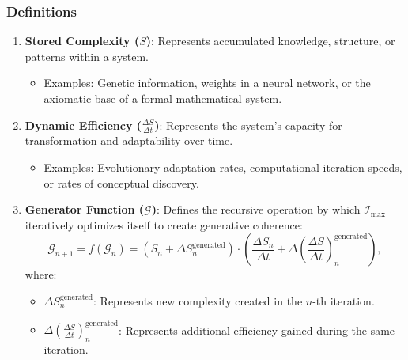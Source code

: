 \documentclass[12pt]{article}
\begin{document}
\subsubsection{Definitions}
\begin{enumerate}
    \item \textbf{Stored Complexity (\(S\))}: Represents accumulated knowledge, structure, or patterns within a system.
        \begin{itemize}
            \item Examples: Genetic information, weights in a neural network, or the axiomatic base of a formal mathematical system.
        \end{itemize}
    \item \textbf{Dynamic Efficiency (\(\frac{\Delta S}{\Delta t}\))}: Represents the system’s capacity for transformation and adaptability over time.
        \begin{itemize}
            \item Examples: Evolutionary adaptation rates, computational iteration speeds, or rates of conceptual discovery.
        \end{itemize}
    \item \textbf{Generator Function (\(\mathcal{G}\))}: Defines the recursive operation by which \(\mathcal{I}_{\text{max}}\) iteratively optimizes itself to create generative coherence:
        \[
        \mathcal{G}_{n+1} = f(\mathcal{G}_n) = \left(S_n + \Delta S_n^{\text{generated}}\right) \cdot \left(\frac{\Delta S_n}{\Delta t} + \Delta \left(\frac{\Delta S}{\Delta t}\right)_n^{\text{generated}}\right),
        \]
        where:
        \begin{itemize}
            \item \(\Delta S_n^{\text{generated}}\): Represents new complexity created in the \(n\)-th iteration.
            \item \(\Delta \left(\frac{\Delta S}{\Delta t}\right)_n^{\text{generated}}\): Represents additional efficiency gained during the same iteration.
        \end{itemize}
\end{enumerate}
\end{document}
